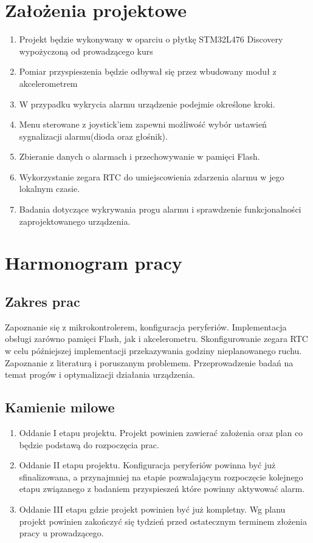 \documentclass[10pt, a4paper]{article}
\begin{document}
\section{Założenia projektowe}
\begin{enumerate}
\item Projekt będzie wykonywany w oparciu o płytkę STM32L476 Discovery wypożyczoną od prowadzącego kurs
\item Pomiar przyspieszenia będzie odbywał się przez wbudowany moduł z akcelerometrem
\item W przypadku wykrycia alarmu urządzenie podejmie określone kroki.
\item Menu sterowane z joystick'iem zapewni możliwość wybór ustawień sygnalizacji alarmu(dioda oraz głośnik).
\item Zbieranie danych o alarmach i przechowywanie w pamięci Flash.
\item Wykorzystanie zegara RTC do umiejscowienia zdarzenia alarmu w jego lokalnym czasie.
\item Badania dotyczące wykrywania progu alarmu i sprawdzenie funkcjonalności zaprojektowanego urządzenia.

\end{enumerate}


\section{Harmonogram pracy}

\subsection{Zakres prac}
Zapoznanie się z mikrokontrolerem, konfiguracja peryferiów. Implementacja obsługi zarówno pamięci Flash, jak i akcelerometru. Skonfigurowanie zegara RTC w celu późniejszej implementacji przekazywania godziny nieplanowanego ruchu. Zapoznanie z literaturą i poruszanym problemem. Przeprowadzenie badań na temat progów i optymalizacji działania urządzenia. 
\subsection{Kamienie milowe}
\begin{enumerate}
\item Oddanie I etapu projektu. Projekt powinien zawierać założenia oraz plan co będzie podstawą do rozpoczęcia prac.
\item Oddanie II etapu projektu. Konfiguracja peryferiów powinna być już sfinalizowana, a przynajmniej na etapie pozwalającym rozpoczęcie kolejnego etapu związanego z badaniem przyspieszeń które powinny aktywować alarm.
\item Oddanie III etapu gdzie projekt powinien być już kompletny.
Wg planu projekt powinien zakończyć się tydzień przed ostatecznym terminem złożenia pracy u prowadzącego.
\end{enumerate}
\end{document}
